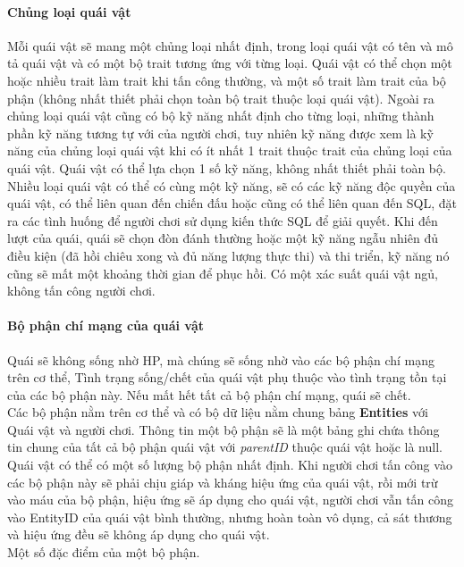 \paragraph{Chủng loại quái vật}

\hspace{0.5cm} Mỗi quái vật sẽ mang một chủng loại nhất định, trong loại quái vật có tên và mô tả quái vật và có một bộ trait tương ứng với từng loại. Quái vật có thể chọn một hoặc nhiều trait làm trait khi tấn công thường, và một số trait làm trait của bộ phận (không nhất thiết phải chọn toàn bộ trait thuộc loại quái vật). Ngoài ra chủng loại quái vật cũng có bộ kỹ năng nhất định cho từng loại, những thành phần kỹ năng tương tự với của người chơi, tuy nhiên kỹ năng được xem là kỹ năng của chủng loại quái vật khi có ít nhất 1 trait thuộc trait của chủng loại của quái vật. Quái vật có thể lựa chọn 1 số kỹ năng, không nhất thiết phải toàn bộ. Nhiều loại quái vật có thể có cùng một kỹ năng, sẽ có các kỹ năng độc quyền của quái vật, có thể liên quan đến chiến đấu hoặc cũng có thể liên quan đến SQL, đặt ra các tình huống để người chơi sử dụng kiến thức SQL để giải quyết. Khi đến lượt của quái, quái sẽ chọn đòn đánh thường hoặc một kỹ năng ngẫu nhiên đủ điều kiện (đã hồi chiêu xong và đủ năng lượng thực thi) và thi triển, kỹ năng nó cũng sẽ mất một khoảng thời gian để phục hồi. Có một xác suất quái vật ngủ, không tấn công người chơi.\\

\paragraph{Bộ phận chí mạng của quái vật}

\hspace*{0.5cm} Quái sẽ không sống nhờ HP, mà chúng sẽ sống nhờ vào các bộ phận chí mạng trên cơ thể, Tình trạng sống/chết của quái vật phụ thuộc vào tình trạng tồn tại của các bộ phận này. Nếu mất hết tất cả bộ phận chí mạng, quái sẽ chết. \\
\hspace*{0.5cm} Các bộ phận nằm trên cơ thể và có bộ dữ liệu nằm chung bảng \textbf{Entities} với Quái vật và người chơi. Thông tin một bộ phận sẽ là một bảng ghi chứa thông tin chung của tất cả bộ phận quái vật với \textit{parentID} thuộc quái vật hoặc là null. Quái vật có thể có một số lượng bộ phận nhất định. Khi người chơi tấn công vào các bộ phận này sẽ phải chịu giáp và kháng hiệu ứng của quái vật, rồi mới trừ vào máu của bộ phận, hiệu ứng sẽ áp dụng cho quái vật, người chơi vẫn tấn công vào EntityID của quái vật bình thường, nhưng hoàn toàn vô dụng, cả sát thương và hiệu ứng đều sẽ không áp dụng cho quái vật.\\ Một số đặc điểm của một bộ phận. \\

